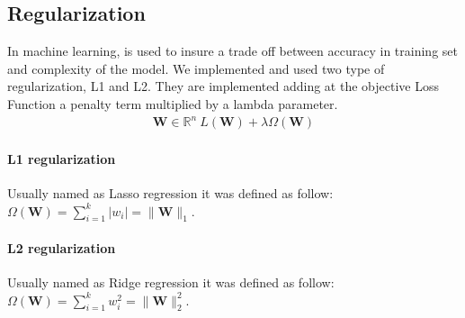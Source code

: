 \subsection{Regularization}
 In machine learning, is used to insure a trade off between accuracy in training set and complexity of the model.
 We implemented and used two type of regularization, L1 and L2. They are implemented adding at the objective Loss Function a penalty term multiplied by a lambda parameter.
\begin{align*}
	{\mathbf{W} \in \mathbb{R}^n} {\ \mathit{L}(\mathbf{W}) + \lambda\Omega(\mathbf{W})}{}{}
	\label{eq:reg}
\end{align*}
 
\paragraph*{L1 regularization}
Usually named as Lasso regression it was defined as follow:
$\Omega(\textbf{W}) = \sum_{i=1}^{k} |w_i| = \|\textbf{W}\|_1$.
\paragraph*{L2 regularization}
Usually named as Ridge regression it was defined as follow:
$\Omega(\textbf{W}) = \sum_{i=1}^{k}w_i^2 = \|\textbf{W}\|_2^2$. 
 
 
